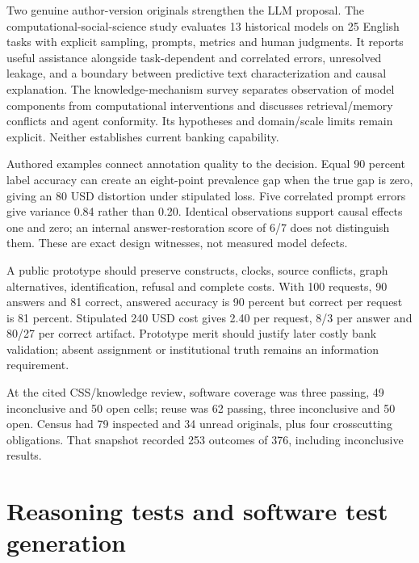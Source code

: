 Two genuine author-version originals strengthen the LLM proposal. The
computational-social-science study evaluates 13 historical models on 25
English tasks with explicit sampling, prompts, metrics and human
judgments. It reports useful assistance alongside task-dependent and
correlated errors, unresolved leakage, and a boundary between predictive
text characterization and causal explanation. The knowledge-mechanism
survey separates observation of model components from computational
interventions and discusses retrieval/memory conflicts and agent
conformity. Its hypotheses and domain/scale limits remain explicit.
Neither establishes current banking capability.
\citep{exec24_css_original,exec24_knowledge_original}

Authored examples connect annotation quality to the decision. Equal 90
percent label accuracy can create an eight-point prevalence gap when the
true gap is zero, giving an 80 USD distortion under stipulated loss.
Five correlated prompt errors give variance 0.84 rather than 0.20.
Identical observations support causal effects one and zero; an internal
answer-restoration score of 6/7 does not distinguish them. These are
exact design witnesses, not measured model defects.
\citep{exec24_css_knowledge_reference}

A public prototype should preserve constructs, clocks, source conflicts,
graph alternatives, identification, refusal and complete costs. With 100
requests, 90 answers and 81 correct, answered accuracy is 90 percent but
correct per request is 81 percent. Stipulated 240 USD cost gives 2.40
per request, 8/3 per answer and 80/27 per correct artifact. Prototype
merit should justify later costly bank validation; absent assignment or
institutional truth remains an information requirement.
\citep{exec24_css_knowledge_reference}

At the cited CSS/knowledge review, software coverage was three passing,
49 inconclusive and 50 open cells; reuse was 62 passing, three
inconclusive and 50 open. Census had 79 inspected and 34 unread
originals, plus four crosscutting obligations. That snapshot recorded
253 outcomes of 376, including inconclusive results.
\citep{sp24cssknowledge_reader,sp24cssknowledge_progress}

\hypertarget{reasoning-tests-and-software-test-generation}{%
\section{Reasoning tests and software test
generation}\label{reasoning-tests-and-software-test-generation}}

